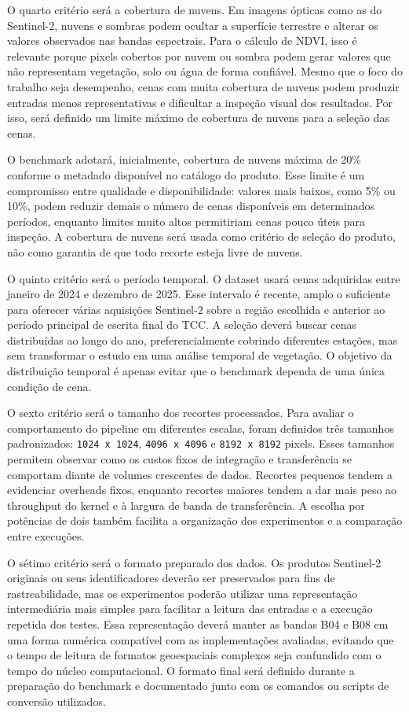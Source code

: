 \documentclass[tcc,capa]{texufpel}
\begin{document}
O quarto critério será a cobertura de nuvens. Em imagens ópticas como as do Sentinel-2, nuvens e sombras podem ocultar a superfície terrestre e alterar os valores observados nas bandas espectrais. Para o cálculo de NDVI, isso é relevante porque pixels cobertos por nuvem ou sombra podem gerar valores que não representam vegetação, solo ou água de forma confiável. Mesmo que o foco do trabalho seja desempenho, cenas com muita cobertura de nuvens podem produzir entradas menos representativas e dificultar a inspeção visual dos resultados. Por isso, será definido um limite máximo de cobertura de nuvens para a seleção das cenas.

O benchmark adotará, inicialmente, cobertura de nuvens máxima de 20\% conforme o metadado disponível no catálogo do produto. Esse limite é um compromisso entre qualidade e disponibilidade: valores mais baixos, como 5\% ou 10\%, podem reduzir demais o número de cenas disponíveis em determinados períodos, enquanto limites muito altos permitiriam cenas pouco úteis para inspeção. A cobertura de nuvens será usada como critério de seleção do produto, não como garantia de que todo recorte esteja livre de nuvens.

O quinto critério será o período temporal. O dataset usará cenas adquiridas entre janeiro de 2024 e dezembro de 2025. Esse intervalo é recente, amplo o suficiente para oferecer várias aquisições Sentinel-2 sobre a região escolhida e anterior ao período principal de escrita final do TCC. A seleção deverá buscar cenas distribuídas ao longo do ano, preferencialmente cobrindo diferentes estações, mas sem transformar o estudo em uma análise temporal de vegetação. O objetivo da distribuição temporal é apenas evitar que o benchmark dependa de uma única condição de cena.

O sexto critério será o tamanho dos recortes processados. Para avaliar o comportamento do pipeline em diferentes escalas, foram definidos três tamanhos padronizados: \texttt{1024 x 1024}, \texttt{4096 x 4096} e \texttt{8192 x 8192} pixels. Esses tamanhos permitem observar como os custos fixos de integração e transferência se comportam diante de volumes crescentes de dados. Recortes pequenos tendem a evidenciar overheads fixos, enquanto recortes maiores tendem a dar mais peso ao throughput do kernel e à largura de banda de transferência. A escolha por potências de dois também facilita a organização dos experimentos e a comparação entre execuções.

O sétimo critério será o formato preparado dos dados. Os produtos Sentinel-2 originais ou seus identificadores deverão ser preservados para fins de rastreabilidade, mas os experimentos poderão utilizar uma representação intermediária mais simples para facilitar a leitura das entradas e a execução repetida dos testes. Essa representação deverá manter as bandas B04 e B08 em uma forma numérica compatível com as implementações avaliadas, evitando que o tempo de leitura de formatos geoespaciais complexos seja confundido com o tempo do núcleo computacional. O formato final será definido durante a preparação do benchmark e documentado junto com os comandos ou scripts de conversão utilizados.
\end{document}
